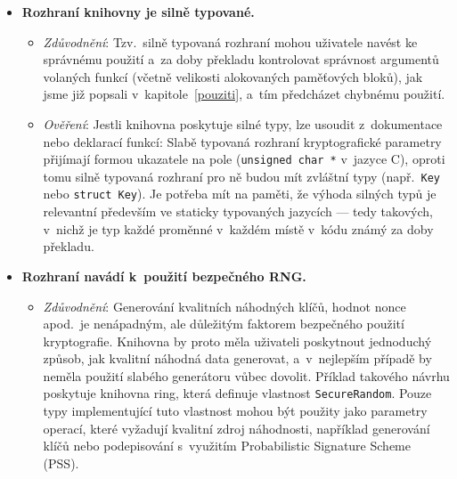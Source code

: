 \begin{itemize}
\begin{itemize}[beginpenalty=10000]
        \item \textit{Ověření}: Mechanismus zpracování chyb by měl vyplynout z~deklarovaného rozhraní funkcí ať už v~kódu, nebo v~dokumentaci. Nežádoucí je hlášení chyb prostřednictvím návratových kódů, které může programátor ignorovat, některé jazyky (např.~C) však lepší způsob k~dispozici nemají. Vhodným prostředkem jsou výjimky (C++, Java, Python, \dots), případně dedikované monadické typy\footnote{Typ \texttt{Result} v~Rustu, \texttt{std::expected} v~C++, apod.} v~jazycích, které programátora nutí návratové hodnoty funkcí konzumovat (Rust). Výjimky jsou obecně považovány za pomalejší z~hlediska výkonu, jejich použití je ale poměrně přímočaré; oproti tomu neobezřetným použitím monadických typů lze zapříčinit vznik závažných chyb, jak ukazuje zranitelnost ve validaci TLS certifikátů CVE-2019-15545~\cite{cve-2019-15545} způsobená nesprávným použitím metody \texttt{Result<T,~E>::map} na\-mí\-s\-to \texttt{Result<T,~E>::and\_then}.
    \end{itemize}

    \item \textbf{Rozhraní knihovny je silně typované.} 
    \begin{itemize}[beginpenalty=10000]
        \item \textit{Zdůvodnění}: Tzv.~silně typovaná rozhraní mohou uživatele navést ke správnému použití a~za doby překladu kontrolovat správnost argumentů volaných funkcí (včetně velikosti alokovaných paměťových bloků), jak jsme již popsali v~kapitole~\ref{pouziti}, a~tím předcházet chybnému použití.

        \item \textit{Ověření}: Jestli knihovna poskytuje silné typy, lze usoudit z~dokumentace nebo deklarací funkcí: Slabě typovaná rozhraní kryptografické parametry přijímají formou ukazatele na pole (\texttt{unsigned char *} v~jazyce C), oproti tomu silně typovaná rozhraní pro ně budou mít zvláštní typy (např.\ \texttt{Key} nebo \texttt{struct Key}). Je potřeba mít na paměti, že výhoda silných typů je relevantní především ve staticky typovaných jazycích --- tedy takových, v~nichž je typ každé proměnné v~každém místě v~kódu známý za doby překladu.
    \end{itemize}
    
    \item \textbf{Rozhraní navádí k~použití bezpečného RNG.} 
    \begin{itemize}[beginpenalty=10000]
        \item \textit{Zdůvodnění}: Generování kvalitních náhodných klíčů, hodnot nonce apod.\ je ne\-ná\-pad\-ným, ale důležitým faktorem bezpečného použití kryptografie. Knihovna by proto měla uživateli poskytnout jednoduchý způsob, jak kvalitní náhodná data generovat, a~v~nejlepším případě by neměla použití slabého generátoru vůbec dovolit. Příklad takového návrhu poskytuje knihovna ring, která definuje vlastnost \texttt{SecureRandom}. Pouze typy implementující tuto vlastnost mohou být použity jako parametry operací, které vyžadují kvalitní zdroj náhodnosti, například generování klíčů nebo podepisování s~využitím Probabilistic Signature Scheme (PSS).


\end{itemize}
\end{itemize}
